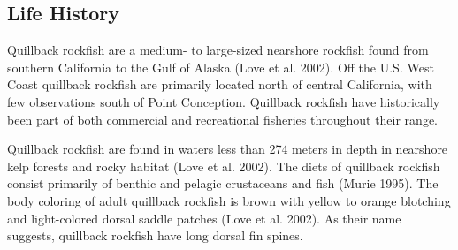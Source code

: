 \documentclass[11pt,
  english,
  letterpaper,
]{article}
\begin{document}
\leavevmode\tagmcend\tagstructend\par


\hypertarget{life-history}{%
\subsection{Life History}\label{life-history}}

\leavevmode\tagmcend\tagstructend


Quillback rockfish are a medium- to large-sized nearshore rockfish found from southern California to the Gulf of Alaska {(Love et al. 2002)\leavevmode\tagmcend\tagstructend}. Off the U.S. West Coast quillback rockfish are primarily located north of central California, with few observations south of Point Conception. Quillback rockfish have historically been part of both commercial and recreational fisheries throughout their range.

\leavevmode\tagmcend\tagstructend\par


Quillback rockfish are found in waters less than 274 meters in depth in nearshore kelp forests and rocky habitat {(Love et al. 2002)\leavevmode\tagmcend\tagstructend}. The diets of quillback rockfish consist primarily of benthic and pelagic crustaceans and fish {(Murie 1995)\leavevmode\tagmcend\tagstructend}. The body coloring of adult quillback rockfish is brown with yellow to orange blotching and light-colored dorsal saddle patches {(Love et al. 2002)\leavevmode\tagmcend\tagstructend}. As their name suggests, quillback rockfish have long dorsal fin spines.

\leavevmode\tagmcend\tagstructend\par

\end{document}
